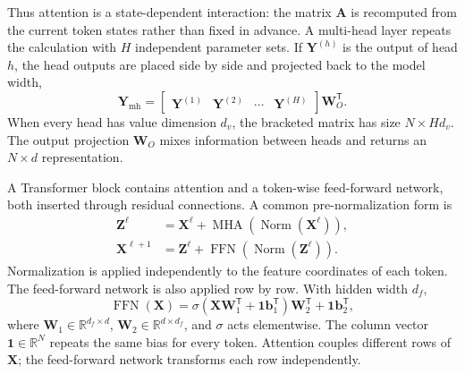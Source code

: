\documentclass[11pt]{article}
\begin{document}
Thus attention is a state-dependent interaction: the matrix $\mathbf A$ is recomputed from the current token states rather than fixed in advance. A multi-head layer repeats the calculation with $H$ independent parameter sets. If $\mathbf Y^{(h)}$ is the output of head $h$, the head outputs are placed side by side and projected back to the model width,
\begin{equation}
\mathbf Y_{\mathrm{mh}}
=
\begin{bmatrix}
\mathbf Y^{(1)} & \mathbf Y^{(2)} & \cdots & \mathbf Y^{(H)}
\end{bmatrix}
\mathbf W_O^{\mathsf T}.
\label{eq:multihead}
\end{equation}
When every head has value dimension $d_v$, the bracketed matrix has size $N\times Hd_v$. The output projection $\mathbf W_O$ mixes information between heads and returns an $N\times d$ representation.

A Transformer block contains attention and a token-wise feed-forward network, both inserted through residual connections. A common pre-normalization form is
\begin{align}
\mathbf Z^\ell
&=
\mathbf X^\ell
+
\operatorname{MHA}
\left(
\operatorname{Norm}(\mathbf X^\ell)
\right),
\label{eq:pre-norm-attention}
\\
\mathbf X^{\ell+1}
&=
\mathbf Z^\ell
+
\operatorname{FFN}
\left(
\operatorname{Norm}(\mathbf Z^\ell)
\right).
\label{eq:pre-norm-ffn}
\end{align}
Normalization is applied independently to the feature coordinates of each token. The feed-forward network is also applied row by row. With hidden width $d_f$,
\begin{equation}
\operatorname{FFN}(\mathbf X)
=
\sigma
\left(
\mathbf X\mathbf W_1^{\mathsf T}
+
\mathbf 1\mathbf b_1^{\mathsf T}
\right)
\mathbf W_2^{\mathsf T}
+
\mathbf 1\mathbf b_2^{\mathsf T},
\label{eq:ffn-matrix}
\end{equation}
where $\mathbf W_1\in\mathbb R^{d_f\times d}$, $\mathbf W_2\in\mathbb R^{d\times d_f}$, and $\sigma$ acts elementwise. The column vector $\mathbf 1\in\mathbb R^N$ repeats the same bias for every token. Attention couples different rows of $\mathbf X$; the feed-forward network transforms each row independently.
\end{document}
